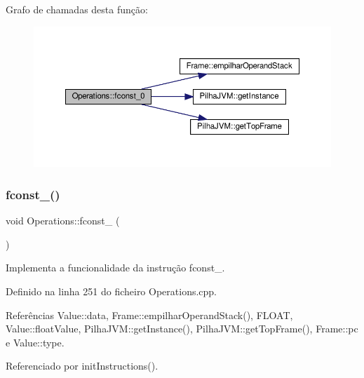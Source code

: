Grafo de chamadas desta função\+:
\nopagebreak
\begin{figure}[H]
\begin{center}
\leavevmode
\includegraphics[width=350pt]{classOperations_ad3d2d82d63e7a96e144cdf014d6fb1d9_cgraph}
\end{center}
\end{figure}
\mbox{\label{classOperations_aa2053d7f3d410a4531f5bd560b4211b4}} 
\subsubsection{\texorpdfstring{fconst\+\_()}{fconst\_1()}}
{\footnotesize\ttfamily void Operations\+::fconst\+\_ (\begin{DoxyParamCaption}{ }\end{DoxyParamCaption})\hspace{0.3cm}{\ttfamily [private]}}



Implementa a funcionalidade da instrução fconst\+\_. 



Definido na linha 251 do ficheiro Operations.\+cpp.



Referências Value\+::data, Frame\+::empilhar\+Operand\+Stack(), F\+L\+O\+AT, Value\+::float\+Value, Pilha\+J\+V\+M\+::get\+Instance(), Pilha\+J\+V\+M\+::get\+Top\+Frame(), Frame\+::pc e Value\+::type.



Referenciado por init\+Instructions().

